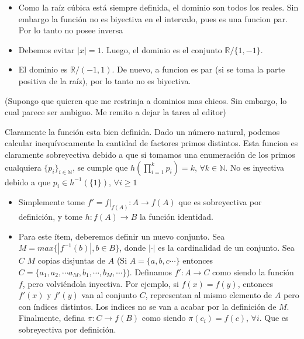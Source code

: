 \begin{sol}
	\begin{itemize}
		\item Como la ra\'iz c\'ubica est\'a siempre definida, el dominio son todos los reales. Sin embargo la funci\'on no es biyectiva en el intervalo, pues es una funcion par. Por lo tanto no posee inversa
		\item Debemos evitar $|x| = 1$. Luego, el dominio es el conjunto $\mathbb{R}/\{1, -1\}$.
		\item El dominio es $\mathbb{R}/(-1, 1)$. De nuevo, a funcion es par (si se toma la parte positiva de la ra\'iz), por lo tanto no es biyectiva.
		
	
	\end{itemize}
	(Supongo que quieren que me restrinja a dominios mas chicos. Sin embargo, lo cual parece ser ambiguo. Me remito a dejar la tarea al editor)
\end{sol}

\begin{sol}
	Claramente la funci\'on esta bien definida. Dado un n\'umero natural, podemos calcular inequ\'ivocamente la cantidad de factores primos distintos. Esta funcion es claramente sobreyectiva debido a que si tomamos una enumeraci\'on de los primos cualquiera $\{p_{i}\}_{i\in \mathbb{N}}$, se cumple que $h(\prod_{i=1}^{k}p_{i}) = k$, $\forall k\in \mathbb{N}$. No es inyectiva debido a que $p_{i} \in h^{-1}(\{1\})$, $\forall i\geq 1$
\end{sol}

\begin{sol}
	\begin{itemize}
		\item Simplemente tome $f' = f|_{f(A)} : A \to f(A)$ que es sobreyectiva por definici\'on, y tome $h : f(A) \to B $ la funci\'on identidad.
		\item Para este \'item, deberemos definir un nuevo conjunto. Sea $M = max \{|f^{-1}(b)|,b \in B \}$, donde $|\cdot|$ es la cardinalidad de un conjunto. Sea $C$ $M$ copias disjuntas de $A$ (Si $A = \{a, b, c \cdots \}$ entonces $C = \{a_{1}, a_{2}, \cdots a_{M}, b_{1}, \cdots  ,b_{M}, \cdots \}$). Definamos $f': A \to C$ como siendo la funci\'on $f$, pero volvi\'endola inyectiva. Por ejemplo, si $f(x) = f(y)$, entonces $f'(x)$ y $f'(y)$ van al conjunto $C$, representan al mismo elemento de $A$ pero con \'indices distintos. Los indices no se van a acabar por la definici\'on de $M$. Finalmente, defina $\pi : C\to f(B)$ como siendo $\pi(c_{i}) = f(c)$, $\forall i$. Que es sobreyectiva por definici\'on.
	\end{itemize}
\end{sol}

